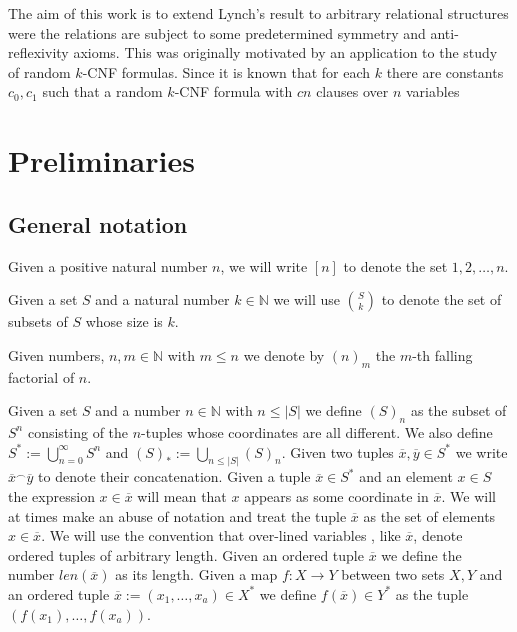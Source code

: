 \documentclass[12pt,notitlepage,a4paper]{article}
\theoremstyle{definition}
\newcommand{\N}{\mathbb{N}}
\begin{document}
The aim of this work is to extend Lynch's result to arbitrary 
relational structures were the relations are subject to some
predetermined symmetry and anti-reflexivity axioms. This was 
originally motivated by an application to the study of random
$k$-CNF formulas. Since \cite{chvatal1992mick} it is known that 
for each $k$ there are constants $c_0,c_1$ such that a random 
$k$-CNF formula with $cn$ clauses over $n$ variables 

% 





\setcounter{section}{0}

\section{Preliminaries}

\subsection{General notation}\label{subsect:notation}

Given a positive natural number $n$, we will write
$[n]$ to denote the set ${1,2,\dots,n}$.\par
Given a set $S$ and a natural number $k\in \N$
we will use $\binom{S}{k}$ to denote the set of 
subsets of $S$ whose size is $k$. \par
Given numbers, $n,m\in \N$ with $m\leq n$ we denote by
$(n)_m$ the $m$-th falling factorial of $n$. \par
Given a set
$S$ and a number $n\in \N$ with $n\leq |S|$ we define
$(S)_n$ as the subset of $S^n$ consisting of the $n$-tuples
whose coordinates are all different. 
We also define $S^*:=\bigcup_{n=0}^\infty S^n$ and
$(S)_*:=\bigcup_{n\leq |S|} (S)_n$. 
Given two tuples $\overline{x},\overline{y}\in S^*$
we write $\overline{x}^\smallfrown \overline{y}$ to denote their 
concatenation. Given a tuple 
$\overline{x}\in S^*$ and an element $x\in S$ the expression
$x\in \overline{x}$ will mean that $x$ appears as some coordinate
in $\overline{x}$. We will at times make an abuse of notation and
treat the tuple $\overline{x}$
as the set of elements $x\in \overline{x}$. 
We will use the convention that over-lined variables
, like $\overline{x}$, denote ordered tuples of arbitrary length.
Given an ordered tuple $\overline{x}$
we define the number $len(\overline{x})$ as its length. 
Given a map $f:X\rightarrow Y$ between two sets $X, Y$ and 
an ordered tuple $\overline{x}:=(x_1,\dots,x_a)\in X^*$ 
we define $f(\overline{x})\in Y^*$ as the tuple 
$(f(x_1),\dots,f(x_a))$.
\par
\end{document}

